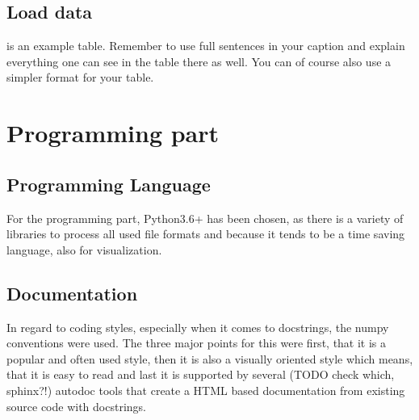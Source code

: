 \subsection{Load data}



 is an example table. Remember to use full sentences in your caption and explain everything one can see in the table there as well. You can of course also use a simpler format for your table.



\section{Programming part}

\subsection{Programming Language}

For the programming part, Python3.6+ has been chosen, as there is a variety of libraries to process all used file formats and because it tends to be a time saving language, also for visualization.\\

\subsection{Documentation}

In regard to coding styles, especially when it comes to docstrings, the numpy conventions were used. The three major points for this were first, that it is a popular and often used style, then it is also a visually oriented style which means, that it is easy to read and last it is supported by several (TODO check which, sphinx?!) autodoc tools that create a HTML based documentation from existing source code with docstrings.\\


